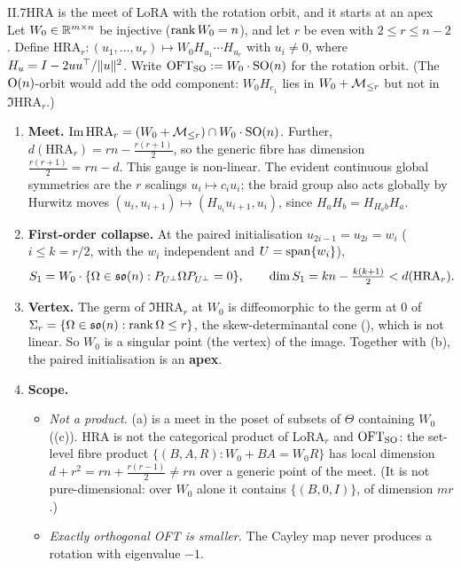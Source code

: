 \begin{theorem}{II.7}{HRA is the meet of LoRA with the rotation orbit, and it starts at an apex}
Let $W_0\in\mathbb{R}^{m\times n}$ be injective ($\operatorname{rank} W_0=n$), and let $r$ be even with $2\le r\le n-2$. Define
$\mathrm{HRA}_r:(u_1,\dots,u_r)\mapsto W_0H_{u_1}\cdots H_{u_r}$ with $u_i\ne0$, where
$H_u=I-2uu^{\top}/\lVert u\rVert^2$. Write $\mathrm{OFT}_{\mathrm{SO}}:=W_0\cdot\mathrm{SO}(n)$ for the rotation orbit. (The $\mathrm{O}(n)$-orbit
would add the odd component: $W_0H_{e_1}$ lies in $W_0+\mathcal{M}_{\le r}$ but not in $\Im\mathrm{HRA}_r$.)
\begin{enumerate}[label=(\alph*)]
  \item \textbf{Meet.} $\operatorname{Im}\mathrm{HRA}_r=(W_0+\mathcal{M}_{\le r})\cap W_0\cdot\mathrm{SO}(n)$. Further, $d(\mathrm{HRA}_r)=rn-\tfrac{r(r+1)}2$,
    so the generic fibre has dimension $\tfrac{r(r+1)}2=rn-d$. This gauge is non-linear. The evident continuous global
    symmetries are the $r$ scalings $u_i\mapsto c_iu_i$; the braid group also acts globally by Hurwitz moves
    $(u_i,u_{i+1})\mapsto(H_{u_i}u_{i+1},u_i)$, since $H_aH_b=H_{H_ab}H_a$.
  \item \textbf{First-order collapse.} At the paired initialisation $u_{2i-1}=u_{2i}=w_i$ ($i\le k=r/2$, with the $w_i$
    independent and $U=\operatorname{span}\{w_i\}$),
    \begin{equation*}
      S_1=W_0\cdot\{\Omega\in\mathfrak{so}(n):P_{U^\perp}\Omega P_{U^\perp}=0\},\qquad\dim S_1=kn-\tfrac{k(k+1)}2<d(\mathrm{HRA}_r).
    \end{equation*}
  \item \textbf{Vertex.} The germ of $\Im\mathrm{HRA}_r$ at $W_0$ is diffeomorphic to the germ at $0$ of
    $\Sigma_r=\{\Omega\in\mathfrak{so}(n):\operatorname{rank}\Omega\le r\}$, the skew-determinantal cone (), which is not linear. So
    $W_0$ is a singular point (the vertex) of the image. Together with (b), the paired initialisation is an \textbf{apex}.
  \item \textbf{Scope.}
    \begin{itemize}
      \item \emph{Not a product.} (a) is a meet in the poset of subsets of $\Theta$ containing $W_0$
        ((c)). HRA is not the
        categorical product of $\mathrm{LoRA}_r$ and $\mathrm{OFT}_{\mathrm{SO}}$: the set-level fibre product
        $\{(B,A,R):W_0+BA=W_0R\}$ has local dimension $d+r^2=rn+\tfrac{r(r-1)}2\ne rn$ over a generic point of the
        meet. (It is not pure-dimensional: over $W_0$ alone it contains $\{(B,0,I)\}$, of dimension $mr$.)
      \item \emph{Exactly orthogonal OFT is smaller.} The Cayley map never produces a rotation with eigenvalue $-1$.

\end{itemize}
\end{enumerate}
\end{theorem}

